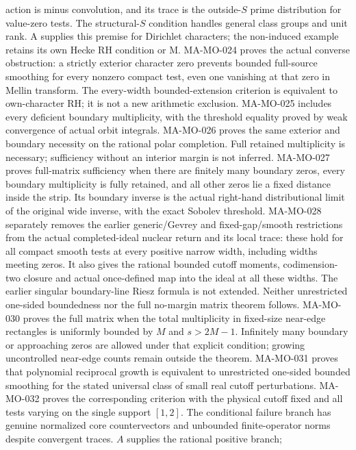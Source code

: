 \documentclass[11pt,a4paper]{article}
\begin{document}
action is minus convolution, and its trace is the outside-$S$
prime distribution for value-zero tests. The structural-$S$
condition handles general class groups and unit rank. A supplies
this premise for Dirichlet characters; the non-induced example
retains its own Hecke RH condition or M.
MA-MO-024 proves the actual converse obstruction: a strictly
exterior character zero prevents bounded full-source smoothing
for every nonzero compact test, even one vanishing at that
zero in Mellin transform. The every-width bounded-extension
criterion is equivalent to own-character RH; it is not a new
arithmetic exclusion. MA-MO-025 includes every deficient
boundary multiplicity, with the threshold equality proved by
weak convergence of actual orbit integrals. MA-MO-026 proves
the same exterior and boundary necessity on the rational
polar completion. Full retained multiplicity is necessary;
sufficiency without an interior margin is not inferred.
MA-MO-027 proves full-matrix sufficiency when there are finitely
many boundary zeros, every boundary multiplicity is fully retained,
and all other zeros lie a fixed distance inside the strip. Its
boundary inverse is the actual right-hand distributional limit of
the original wide inverse, with the exact Sobolev threshold.
MA-MO-028 separately removes the earlier generic/Gevrey and
fixed-gap/smooth restrictions from the actual completed-ideal
nuclear return and its local trace: these hold for all compact
smooth tests at every positive narrow width, including widths
meeting zeros. It also gives the rational bounded cutoff moments,
codimension-two closure and actual once-defined map into the ideal
at all these widths. The earlier singular boundary-line Riesz
formula is not extended. Neither unrestricted one-sided
boundedness nor the full no-margin matrix theorem follows.
MA-MO-030 proves the full matrix when the total multiplicity
in fixed-size near-edge rectangles is uniformly bounded by
$M$ and $s>2M-1$. Infinitely many boundary or approaching
zeros are allowed under that explicit condition; growing
uncontrolled near-edge counts remain outside the theorem.
MA-MO-031 proves that polynomial reciprocal growth is
equivalent to unrestricted one-sided bounded smoothing for
the stated universal class of small real cutoff perturbations.
MA-MO-032 proves the corresponding criterion with the physical
cutoff fixed and all tests varying on the single support $[1,2]$.
The conditional failure branch has genuine normalized core
countervectors and unbounded finite-operator norms despite
convergent traces. $A$ supplies the rational positive branch;
\end{document}
